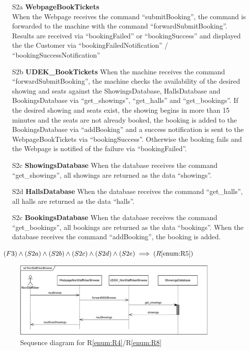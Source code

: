 \documentclass[a4paper,10pt,titlepage,bibtotoc,bibtotocnumbered]{scrreprt}
\begin{document}
\begin{itemize}
\item[S2a] \textbf{WebpageBookTickets}\\
When the Webpage receives the command ``submitBooking'', the command is forwarded to the machine with the command ``forwardSubmitBooking''.
Results are received via ``bookingFailed'' or ``bookingSuccess'' and displayed the the Customer via
``bookingFailedNotification'' / ``bookingSuccessNotification''

\item[S2b] \textbf{UDEK\_BookTickets}
When the machine receives the command ``forwardSubmitBooking'', the machine checks the availability of the desired showing and seats against the ShowingsDatabase, HallsDatabase and BookingsDatabase via ``get\_showings'', ``get\_halls'' and ``get\_bookings''.
If the desired showing and seats exist, the showing begins in more than 15 minutes and the seats are not already booked, the booking is added to the BookingsDatabase via ``addBooking'' and a success notification is sent to the WebpageBookTickets via ``bookingSuccess''.
Otherwise the booking fails and the Webpage is notified of the failure via ``bookingFailed''.

\item[S2c] \textbf{ShowingsDatabase}
When the database receives the command ``get\_showings'', all showings are returned as the data ``showings''.

\item[S2d] \textbf{HallsDatabase}
When the database receives the command ``get\_halls'', all halls are returned as the data ``halls''.

\item[S2c] \textbf{BookingsDatabase}
When the database receives the command ``get\_bookings'', all bookings are returned as the data ``bookings''.
When the database receives the command ``addBooking'', the booking is added.

\end{itemize}

$(F3) \land (S2a) \land (S2b) \land (S2c) \land (S2d) \land (S2e) \implies (R\ref{enum:R5})$

\begin{figure}[H]
    \centering
    \includegraphics[width=0.9\textwidth]{figures/05/a05_sequence_diagram_r04r08.pdf}
    \caption{Sequence diagram for R\ref{enum:R4}/R\ref{enum:R8}}
    \label{figure:sdR48}
\end{figure}
\end{document}
